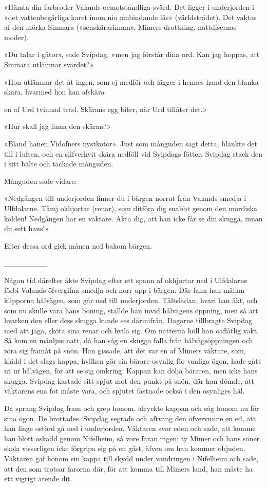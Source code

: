 »Hämta din farbroder Valands oemotståndliga svärd. Det ligger i
underjorden i »det vattenbegärliga karet inom nio ombindande lås»
(världsträdet). Det vaktas af den mörka Sinmara (»senskärarinnan»,
Mimers drottning, nattdisernas moder).

»Du talar i gåtor», sade Svipdag, »men jag förstår dina ord. Kan jag
hoppas, att Sinmara utlämnar svärdet?»

»Hon utlämnar det åt ingen, som ej medför och lägger i hennes hand den
blanka skära, hvarmed hon kan afskära

en af Urd tvinnad tråd. Skärans egg biter, när Urd tillåter det.»

»Hur skall jag finna den skäran?»

»Bland hanen Vidofners
nystkotor». Just som
månguden sagt detta, blänkte det till i luften, och en silfverhvit skära
nedföll vid Svipdags fötter. Svipdag stack den i sitt bälte och tackade
månguden.

Månguden sade vidare:

»Nedgången till underjorden finner du i bärgen norrut från Valands
smedja i Ulfdalarne. Tämj okhjortar (renar), som ditföra dig snabbt
genom den mordiska kölden! Nedgången har en väktare. Akta dig, att han
icke får se din skugga, innan du sett hans!»

Efter dessa ord gick månen ned bakom bärgen.

{\_\_\_\_\_\_\_\_}

Någon tid därefter åkte Svipdag efter ett spann af okhjortar ned i
Ulfdalarne förbi Valands öfvergifna smedja och norr upp i bärgen. Där
fann han mällan klipporna hålvägen, som går ned till underjorden.
Tältslädan, hvari han åkt, och som nu skulle vara hans boning, ställde
han invid hålvägens öppning, men så att hvarken den eller dess skugga
kunde ses därinifrån. Dagarne tillbragte Svipdag med att jaga, sköta
sina renar och hvila sig. Om nätterna höll han oaflåtlig vakt. Så kom en
månljus natt, då han såg en skugga falla från hålvägsöppningen och röra
sig framåt på snön. Han gissade, att det var en af Mimers väktare, som,
klädd i det slags kappa, hvilken gör sin bärare osynlig för vanliga
ögon, hade gått ut ur hålvägen, för att se sig omkring. Kappan kan dölja
bäraren, men icke hans skugga. Svipdag kastade sitt spjut mot den punkt
på snön, där han dömde, att väktarens ena fot måste vara, och spjutet
fastnade också i den osynliges häl.

Då sprang Svipdag fram och grep honom, afryckte kappan och såg honom nu
för sina ögon. De brottades. Svipdag segrade och aftvang den öfvervunne
en ed, att han finge ostörd gå ned i underjorden. Väktaren svor eden och
sade, att komme han blott oskadd genom Nifelheim, så vore faran ingen;
ty Mimer och hans söner skola visserligen icke förgripa sig på en gäst,
äfven om han kommer objuden. Väktaren gaf honom sin kappa till skydd
under vandringen i Nifelheim och sade, att den som trotsar farorna där,
för att komma till Mimers land, han måste ha ett vigtigt ärende dit.

